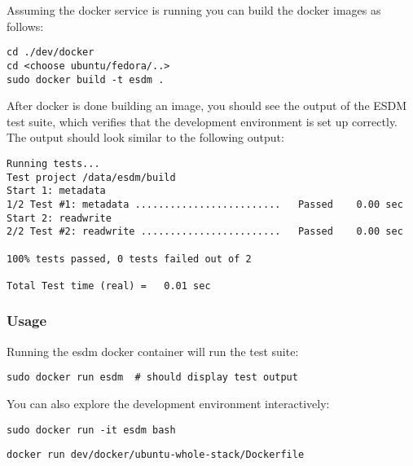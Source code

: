Assuming the docker service is running you can build the docker images as follows:

\begin{lstlisting}
cd ./dev/docker
cd <choose ubuntu/fedora/..>
sudo docker build -t esdm .
\end{lstlisting}

After docker is done building an image, you should see the output of the ESDM test suite, which verifies that the development environment is set up correctly. 
The output should look similar to the following output:

\begin{lstlisting}
Running tests...
Test project /data/esdm/build
Start 1: metadata
1/2 Test #1: metadata .........................   Passed    0.00 sec
Start 2: readwrite
2/2 Test #2: readwrite ........................   Passed    0.00 sec

100% tests passed, 0 tests failed out of 2

Total Test time (real) =   0.01 sec
\end{lstlisting}


\subsubsection{Usage}
Running the esdm docker container will run the test suite:

\begin{lstlisting}
sudo docker run esdm  # should display test output
\end{lstlisting}

You can also explore the development environment interactively:

\begin{lstlisting}
sudo docker run -it esdm bash
\end{lstlisting}

\begin{lstlisting}
docker run dev/docker/ubuntu-whole-stack/Dockerfile
\end{lstlisting}




